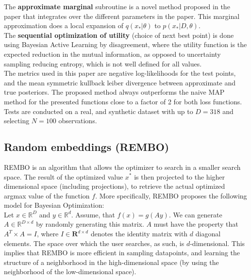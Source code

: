 The \textbf{approximate marginal} subroutine is a novel method proposed in the paper that integrates over the different parameters in the paper.
This marginal approximation does a local expansion of $q(x_* | \theta) $ to $p(x_* | D, \theta)$. \\

The \textbf{sequential optimization of utility} (choice of next best point) is done using Bayesian Active Learning by disagreement, where the utility function is the expected reduction in the mutual information, as opposed to uncertainty sampling reducing entropy, which  is not well defined for all values. \\

The metrics used in this paper are negative log-likelihoods for the test points, and the mean symmetric kullback leiber divergence between approximate and true posteriors.
The proposed method always outperforms the naive MAP method for the presented functions close to a factor of 2 for both loss functions.
Tests are conducted on a real, and synthetic dataset with up to $D = 318$ and selecting $N = 100$ observations. 

\subsection{Random embeddings (REMBO)}
REMBO is an algorithm that allows the optimizer to search in a smaller search space.
The result of the optimized value $x^*$ is then projected to the higher dimensional space (including projections), to retrieve the actual optimized argmax value of the function $f$. 
More specifically, REMBO proposes the following model for Bayesian Optimization: \\

\citep{Wang2013} Let $x \in \mathbb{R}^D$ and $y \in \mathbb{R}^d$. Assume, that $f(x) = g(Ay)$. We can generate $A \in \mathbb{R}^{D \times d}$ by randomly generating this matrix.
$A$ must have the property that $A^T \times A = I$, where $I \in \mathbf{R}^{d \times d}$ denotes the identity matrix with $d$ diagonal elements.
The space over which the user searches, as such, is $d$-dimensional.
This implies that REMBO is more efficient in sampling datapoints, and learning the structure of a neighborhood in the high-dimensional space (by using the neighborhood of the low-dimensional space). \\

